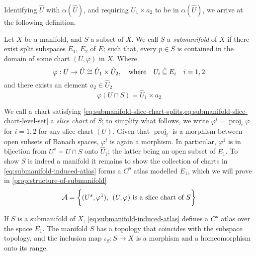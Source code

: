 \documentclass[../main-v2-manifolds.tex]{subfiles}
\begin{document}
Identifying $\hat{U}$ with $\alpha(\hat{U})$, and requiring $U_1\times a_2$ to be in $\alpha(\hat{U})$, we arrive at the following definition.
\begin{definition}[Submanifold]
    Let $X$ be a manifold, and $S$ a subset of $X$. We call $S$ a \emph{submanifold} of $X$ if there exist split subspaces $E_1$, $E_2$ of $E$; such that, every $p\in S$ is contained in the domain of some chart $(U,\varphi)$ in $X$. Where
    \begin{equation}\label{eq:submanifold-slice-chart-splits}
        \varphi: U\to \hat{U}\cong \hat{U}_1\times \hat{U}_2,\qqtext{where} U_i\osub E_i\quad i=1,2
    \end{equation}
    and there exists an element $a_2\in \hat{U}_2$
    \begin{equation}\label{eq:submanifold-slice-chart-level-set}
        \varphi(U\cap S) = \hat{U}_1\times a_2
    \end{equation}
\end{definition}
We call a chart satisfying \cref{eq:submanifold-slice-chart-splits,eq:submanifold-slice-chart-level-set} a \emph{slice chart} of $S$; to simplify what follows, we write $\varphi^i = \operatorname{proj}_i\varphi$ for $i = 1,2$ for any slice chart $(U)$. Given that $\operatorname{proj}_i$ is a morphism between open subsets of Banach spaces, $\varphi^i$ is again a morphism. In particular, $\varphi^1$ is in bijection from $U^s=U\cap S$ onto $\hat{U}_1$; the latter being an open subset of $E_1$. To show $S$ is indeed a manifold it remains to show the collection of charts in \cref{eq:submanifold-induced-atlas} forms a $C^p$ atlas modelled $E_1$, which we will prove in \cref{prop:structure-of-submanifold}
\begin{equation}\label{eq:submanifold-induced-atlas}
    \mathcal{A} = \biggl\{{(U^s, \varphi^1),\:\: (U,\varphi)\text{ is a slice chart of }S}\biggr\}
\end{equation}
\begin{wts}\label{prop:structure-of-submanifold}
    If $S$ is a submanifold of $X$, \cref{eq:submanifold-induced-atlas} defines a $C^p$ atlas over the space $E_1$. The manifold $S$ has a topology that coincides with the subspace topology, and the inclusion map $\iota_S: S\to X$ is a morphism and a homeomorphism onto its range.
\end{wts}
\end{document}
